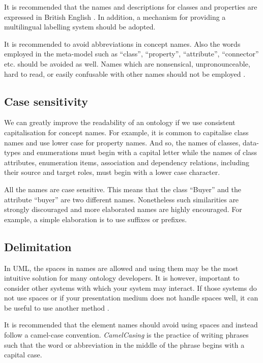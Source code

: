 	It is recommended that the names and descriptions for classes and properties are expressed in British English \cite{d2.01-2017}. In addition, a mechanism for providing a multilingual labelling system should be adopted. 
	
	It is recommended to avoid abbreviations in concept names. Also the words employed in the meta-model such as ``class'', ``property'', ``attribute'', ``connector'' etc. should be avoided as well. Names which are nonsensical, unpronounceable, hard to read, or easily confusable with other names should not be employed \cite{xml1-spec}.

	\subsection{Case sensitivity}	
	\label{sec:casing}
	
	We can greatly improve the readability of an ontology if we use consistent capitalisation for concept names. For example, it is common to capitalise class names and use lower case for property names. And so, the names of classes, data-types and enumerations must begin with a capital letter while the names of class attributes, enumeration items, association and dependency relations, including their source and target roles, must begin with a lower case character.
	
	All the names are case sensitive. This means that the class ``Buyer'' and the attribute ``buyer'' are two different names. Nonetheless such similarities are strongly discouraged and more elaborated names are highly encouraged. For example, a simple elaboration is to use suffixes or prefixes. 

	\subsection{Delimitation}
	\label{sec:delimitation}
	
	In UML, the spaces in names are allowed and using them may be the most intuitive solution for many ontology developers. It is however, important to consider other systems with which your system may interact. If those systems do not use spaces or if your presentation medium does not handle spaces well, it can be useful to use another method \cite{noy2001}. 
	
	It is recommended that the element names should avoid using spaces and instead follow a camel-case convention. \textit{CamelCasing} is the practice of writing phrases such that the word or abbreviation in the middle of the phrase begins with a capital case. 
	
